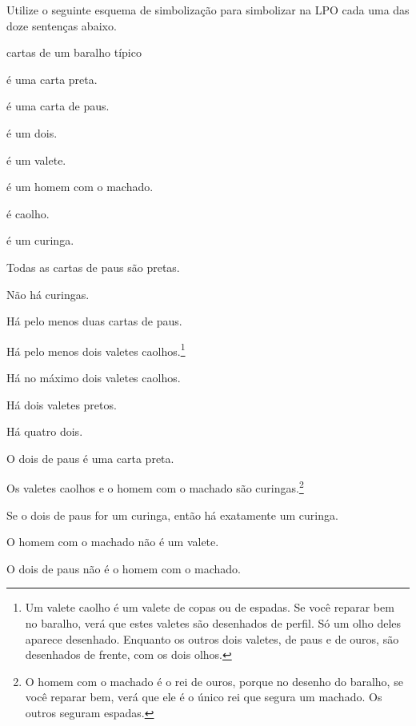 \solutions
\problempart
\label{pr.FOLcards}
Utilize o seguinte esquema de simbolização para simbolizar na LPO cada uma das doze sentenças abaixo.
\begin{center}
\begin{ekey}
\item[\text{domínio}] cartas de um baralho típico
\item[\atom{R}{x}]  é uma carta preta.
\item[\atom{P}{x}]  é uma carta de paus.
\item[\atom{D}{x}]  é um dois.
\item[\atom{V}{x}]  é um valete.
\item[\atom{M}{x}]  é um homem com o machado.
\item[\atom{C}{x}]  é caolho.
\item[\atom{J}{x}]  é um curinga.
\end{ekey}
\end{center}
\begin{earg}
\item Todas as cartas de paus são pretas.
\item Não há curingas.
\item Há pelo menos duas cartas de paus.
\item Há pelo menos dois valetes caolhos.\footnote{
	Um valete caolho é um valete de copas ou de espadas.
	Se você reparar bem no baralho, verá que estes valetes são desenhados de perfil.
	Só um olho deles aparece desenhado.
	Enquanto os outros dois valetes, de paus e de ouros, são desenhados de frente, com os dois olhos.}
\item Há no máximo dois valetes caolhos.
\item Há dois valetes pretos.
\item Há quatro dois.
\item O dois de paus é uma carta preta.
\item Os valetes caolhos e o homem com o machado são curingas.\footnote{
	O homem com o machado é o rei de ouros, porque no desenho do baralho, se você reparar bem, verá que ele é o único rei que segura um machado. Os outros seguram espadas.}
\item Se o dois de paus for um curinga, então há exatamente um curinga.
\item O homem com o machado não é um valete.
\item O dois de paus não é o homem com o machado.
\end{earg}


